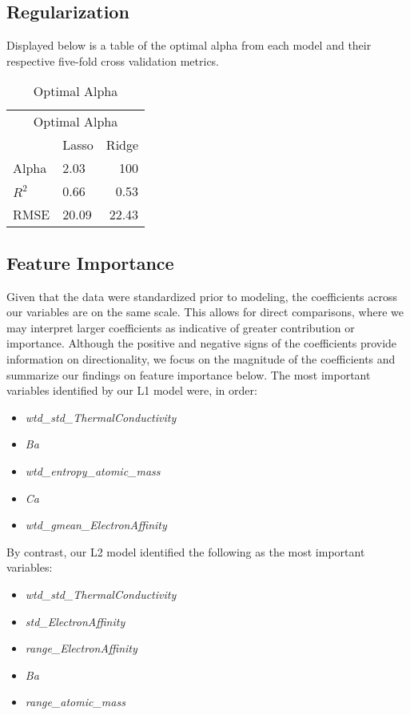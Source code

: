 \documentclass[twoside,twocolumn]{article}
\begin{document}
\subsection{Regularization}
Displayed below is a table of the optimal alpha from each model and their respective five-fold cross validation metrics.\\
\begin{table}[h!]
\centering
\begin{tabular}{llr}
\toprule
\multicolumn{3}{c}{Optimal Alpha} \\
\cmidrule(r){1-3}
        & Lasso & Ridge \\ \midrule
Alpha   & 2.03 & 100 \\
$R^{2}$      & 0.66 & 0.53 \\
RMSE    & 20.09 & 22.43 \\ \bottomrule
\end{tabular}
\caption{Optimal Alpha}
\end{table}

\subsection{Feature Importance}
Given that the data were standardized prior to modeling, the coefficients across our variables are on the same scale. This allows for direct comparisons, where we may interpret larger coefficients as indicative of greater contribution or importance. Although the positive and negative signs of the coefficients provide information on directionality, we focus on the magnitude of the coefficients and summarize our findings on feature importance below. 
The most important variables identified by our L1 model were, in order:
\begin{itemize}
    \item \emph{wtd\_std\_ThermalConductivity}
    \item \emph{Ba}
    \item \emph{wtd\_entropy\_atomic\_mass}
    \item \emph{Ca}
    \item \emph{wtd\_gmean\_ElectronAffinity}
\end{itemize}
By contrast, our L2 model identified the following as the most important variables:
\begin{itemize}
    \item \emph{wtd\_std\_ThermalConductivity}
    \item \emph{std\_ElectronAffinity}
    \item \emph{range\_ElectronAffinity}
    \item \emph{Ba}
    \item \emph{range\_atomic\_mass}
\end{itemize}
\end{document}
